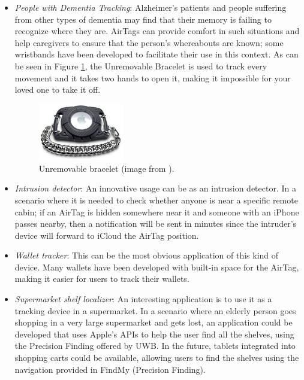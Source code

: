 \documentclass[english]{article}
\begin{document}
\begin{itemize}
  \item \textit{People with Dementia Tracking}: Alzheimer’s patients and people suffering from other types of dementia may find that their memory is failing to recognize where they are. AirTags can provide comfort in such situations and help caregivers to ensure that the person’s whereabouts are known; some wristbands have been developed to facilitate their use in this context. As can be seen in Figure \ref{img:brac}, the Unremovable Bracelet is used to track every movement and it takes two hands to open it, making it impossible for your loved one to take it off.
  \begin{figure}[]
    \centering
    \includegraphics[width=0.35\textwidth]{images/AirT-Blk-Sm.jpg}
    \caption{Unremovable bracelet (image from \cite{bracelets}).}
    \label{img:brac}
  \end{figure}
  \item \textit{Intrusion detector}: An innovative usage can be as an intrusion detector. In a scenario where it is needed to check whether anyone is near a specific remote cabin; if an AirTag is hidden somewhere near it and someone with an iPhone passes nearby, then a notification will be sent in minutes since the intruder's device will forward to iCloud the AirTag position.
  \item \textit{Wallet tracker}: This can be the most obvious application of this kind of device. Many wallets have been developed with built-in space for the AirTag, making it easier for users to track their wallets.
  \item \textit{Supermarket shelf localizer}: An interesting application is to use it as a tracking device in a supermarket. In a scenario where an elderly person goes shopping in a very large supermarket and gets lost, an application could be developed that uses Apple’s APIs to help the user find all the shelves, using the Precision Finding offered by UWB. In the future, tablets integrated into shopping carts could be available, allowing users to find the shelves using the navigation provided in FindMy (Precision Finding).
\end{itemize}
\end{document}
